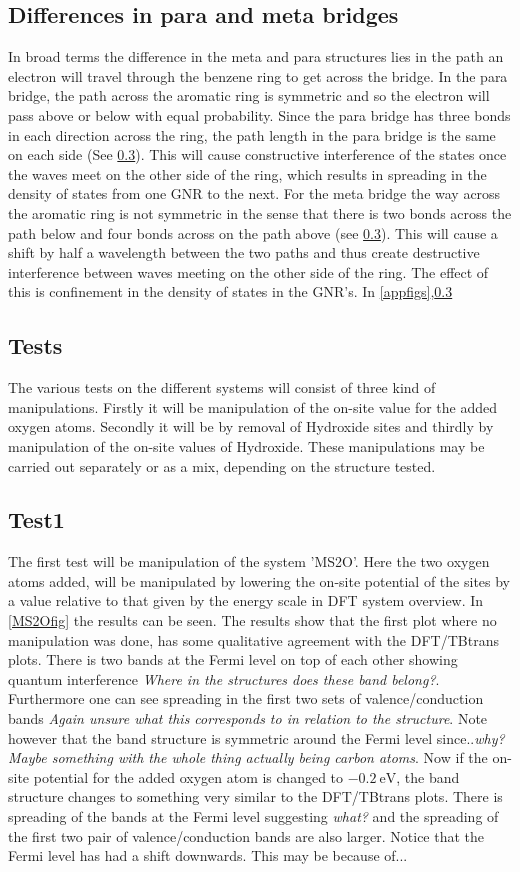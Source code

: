 \subsection{Differences in para and meta bridges}
In broad terms the difference in the meta and para structures lies in the path an electron will travel through the benzene ring to get across the bridge. In the para bridge, the path across the aromatic ring is symmetric and so the electron will pass above or below with equal probability. Since the para bridge has three bonds in each direction across the ring, the path length in the para bridge is the same on each side (See \cref{}). This will cause constructive interference of the states once the waves meet on the other side of the ring, which results in spreading in the density of states from one GNR to the next. For the meta bridge the way across the aromatic ring is not symmetric in the sense that there is two bonds across the path below and four bonds across on the path above (see \cref{}). This will cause a shift by half a wavelength between the two paths and thus create destructive interference between waves meeting on the other side of the ring. The effect of this is confinement in the density of states in the GNR's. In \cref{appfigs},\cref{}
\subsection{Tests}
The various tests on the different systems will consist of three kind of manipulations. Firstly it will be manipulation of the on-site value for the added oxygen atoms. Secondly it will be by removal of Hydroxide sites and thirdly by manipulation of the on-site values of Hydroxide. These manipulations may be carried out separately or as a mix, depending on the structure tested. \\
\subsection{Test1}
The first test will be manipulation of the system 'MS2O'. Here the two oxygen atoms added, will be manipulated by lowering the on-site potential of the sites by a value relative to that given by the energy scale in DFT system overview. In \cref{MS2Ofig} the results can be seen.
The results show that the first plot where no manipulation was done, has some qualitative agreement with the DFT/TBtrans plots. There is two bands at the Fermi level on top of each other showing quantum interference \textit{Where in the structures does these band belong?}. Furthermore  one can see spreading in the first two sets of valence/conduction bands \textit{Again unsure what this corresponds to in relation to the structure}. Note however that the band structure is symmetric around the Fermi level since..\textit{why? Maybe something with the whole thing actually being carbon atoms}. Now if the on-site potential for the added oxygen atom is changed to \(\SI{-0.2}{\electronvolt}\), the band structure changes to something very similar to the DFT/TBtrans plots. There is spreading of the bands at the Fermi level suggesting \textit{what?} and the spreading of the first two pair of valence/conduction bands are also larger. Notice that the Fermi level has had a shift downwards. This may be because of...
